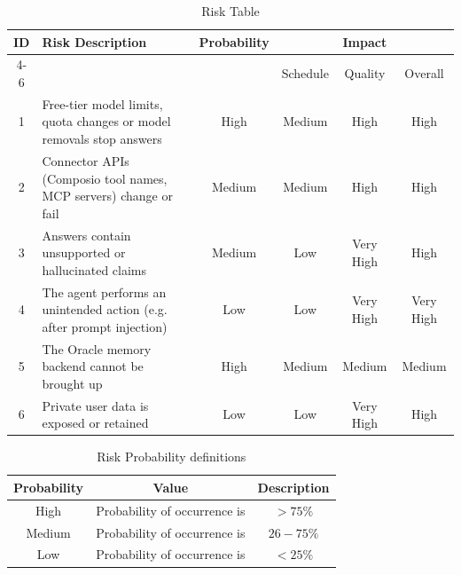 \documentclass[oneside,a4paper,12pt]{report}
\begin{document}
\begin{table}[!htbp]
\begin{center}
\def\arraystretch{1.5}
\begin{tabularx}{\textwidth}{| c | X | c | c | c | c |}
\hline
\multirow{2}{*}{ID} & \multirow{2}{*}{Risk Description}	& \multirow{2}{*}{Probability} & \multicolumn{3}{|c|}{Impact} \\ \cline{4-6}
	& & &	Schedule	& Quality	& Overall \\ \hline
1	& Free-tier model limits, quota changes or model removals stop answers	& High	& Medium	& High	& High \\ \hline
2	& Connector APIs (Composio tool names, MCP servers) change or fail	& Medium	& Medium	& High	& High \\ \hline
3	& Answers contain unsupported or hallucinated claims	& Medium	& Low	& Very High	& High \\ \hline
4	& The agent performs an unintended action (e.g. after prompt injection)	& Low	& Low	& Very High	& Very High \\ \hline
5	& The Oracle memory backend cannot be brought up	& High	& Medium	& Medium	& Medium \\ \hline
6	& Private user data is exposed or retained	& Low	& Low	& Very High	& High \\ \hline
\end{tabularx}
\end{center}
\caption{Risk Table}
\label{tab:risk}
\end{table}


\begin{table}[!htbp]
\begin{center}
\def\arraystretch{1.5}
\begin{tabular}{| c | c | c |}
\hline
Probability & Value &	Description \\ \hline
High &	Probability of occurrence is &  $ > 75 \% $ \\ \hline
Medium &	Probability of occurrence is  & $26-75 \% $ \\ \hline
Low	& Probability of occurrence is & $ < 25 \% $ \\ \hline
\end{tabular}
\end{center}
\caption{Risk Probability definitions \cite{bookPressman}}
\label{tab:riskdef}
\end{table}
\end{document}
